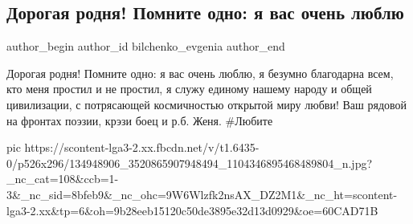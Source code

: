  
 
 
 
 
 
\subsection{Дорогая родня! Помните одно: я вас очень люблю}
\label{sec:31_12_2020.fb.bilchenko_evgenia.2.ljublju_rodnja}
\ifcmt
 author_begin
   author_id bilchenko_evgenia
 author_end
\fi

Дорогая родня! Помните одно: я вас очень люблю, я безумно благодарна всем, кто
меня простил и не простил, я служу единому нашему народу и общей цивилизации, с
потрясающей космичностью открытой миру любви! Ваш рядовой на фронтах поэзии,
крэзи боец и р.б. Женя. \#Любите

\ifcmt
  pic https://scontent-lga3-2.xx.fbcdn.net/v/t1.6435-0/p526x296/134948906_3520865907948494_1104346895468489804_n.jpg?_nc_cat=108&ccb=1-3&_nc_sid=8bfeb9&_nc_ohc=9W6Wlzfk2nsAX_DZ2M1&_nc_ht=scontent-lga3-2.xx&tp=6&oh=9b28eeb15120c50de3895e32d13d0929&oe=60CAD71B
\fi
